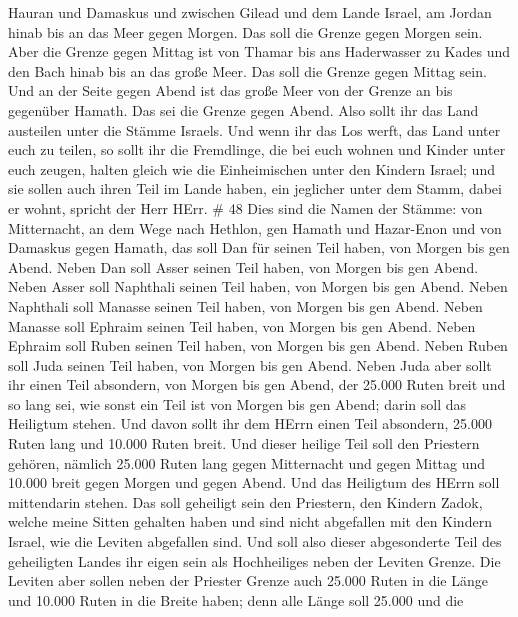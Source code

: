Hauran und Damaskus und zwischen Gilead und dem Lande Israel, am Jordan
hinab bis an das Meer gegen Morgen. Das soll die Grenze gegen Morgen
sein.  Aber die Grenze gegen Mittag ist von Thamar bis ans
Haderwasser zu Kades und den Bach hinab bis an das große Meer. Das soll
die Grenze gegen Mittag sein.  Und an der Seite gegen Abend
ist das große Meer von der Grenze an bis gegenüber Hamath. Das sei die
Grenze gegen Abend.  Also sollt ihr das Land austeilen
unter die Stämme Israels.  Und wenn ihr das Los werft, das
Land unter euch zu teilen, so sollt ihr die Fremdlinge, die bei euch
wohnen und Kinder unter euch zeugen, halten gleich wie die Einheimischen
unter den Kindern Israel;  und sie sollen auch ihren Teil
im Lande haben, ein jeglicher unter dem Stamm, dabei er wohnt, spricht
der Herr HErr. \# 48  Dies sind die Namen der Stämme: von
Mitternacht, an dem Wege nach Hethlon, gen Hamath und Hazar-Enon und von
Damaskus gegen Hamath, das soll Dan für seinen Teil haben, von Morgen
bis gen Abend.  Neben Dan soll Asser seinen Teil haben, von
Morgen bis gen Abend.  Neben Asser soll Naphthali seinen
Teil haben, von Morgen bis gen Abend.  Neben Naphthali soll
Manasse seinen Teil haben, von Morgen bis gen Abend.  Neben
Manasse soll Ephraim seinen Teil haben, von Morgen bis gen Abend.
 Neben Ephraim soll Ruben seinen Teil haben, von Morgen bis
gen Abend.  Neben Ruben soll Juda seinen Teil haben, von
Morgen bis gen Abend.  Neben Juda aber sollt ihr einen Teil
absondern, von Morgen bis gen Abend, der 25.000 Ruten breit und so lang
sei, wie sonst ein Teil ist von Morgen bis gen Abend; darin soll das
Heiligtum stehen.  Und davon sollt ihr dem HErrn einen Teil
absondern, 25.000 Ruten lang und 10.000 Ruten breit.  Und
dieser heilige Teil soll den Priestern gehören, nämlich 25.000 Ruten
lang gegen Mitternacht und gegen Mittag und 10.000 breit gegen Morgen
und gegen Abend. Und das Heiligtum des HErrn soll mittendarin stehen.
 Das soll geheiligt sein den Priestern, den Kindern Zadok,
welche meine Sitten gehalten haben und sind nicht abgefallen mit den
Kindern Israel, wie die Leviten abgefallen sind.  Und soll
also dieser abgesonderte Teil des geheiligten Landes ihr eigen sein als
Hochheiliges neben der Leviten Grenze.  Die Leviten aber
sollen neben der Priester Grenze auch 25.000 Ruten in die Länge und
10.000 Ruten in die Breite haben; denn alle Länge soll 25.000 und die
